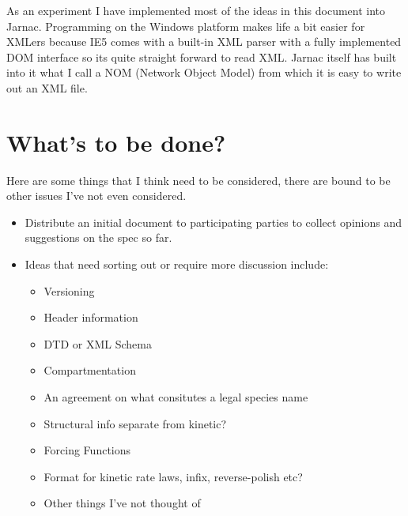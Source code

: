 \documentclass{article}
\begin{document}
As an experiment I have implemented most of the ideas in this document into
Jarnac. Programming on the Windows platform makes life a bit easier for XMLers
because IE5 comes with a built-in XML parser with a fully implemented DOM
interface so its quite straight forward to read XML. Jarnac itself has built
into it what I call a NOM (Network Object Model) from which it is easy to
write out an XML file.

\section*{What's to be done?}

Here are some things that I think need to be considered, there are bound to be
other issues I've not even considered.

\begin{itemize}
\item Distribute an initial document to participating parties to collect
opinions and suggestions on the spec so far.
\item Ideas that need sorting out or require more discussion include:
\begin{itemize}
\item Versioning
\item Header information
\item DTD or XML Schema
\item Compartmentation
\item An agreement on what consitutes a legal species name
\item Structural info separate from kinetic?
\item Forcing Functions
\item Format for kinetic rate laws, infix, reverse-polish etc?
\item Other things I've not thought of
\end{itemize}
\end{itemize}
\end{document}
